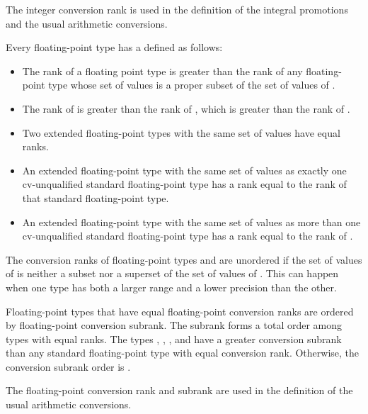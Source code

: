 \begin{note}
The integer conversion rank is used in the definition of the integral
promotions and the usual arithmetic
conversions.
\end{note}

\pnum
Every floating-point type has a 
defined as follows:
\begin{itemize}
\item
The rank of a floating point type  is greater than
the rank of any floating-point type
whose set of values is a proper subset of the set of values of .
\item
The rank of  is greater than
the rank of ,
which is greater than the rank of .
\item
Two extended floating-point types with the same set of values have equal ranks.
\item
An extended floating-point type with the same set of values as
exactly one cv-unqualified standard floating-point type
has a rank equal to the rank of that standard floating-point type.
\item
An extended floating-point type with the same set of values as
more than one cv-unqualified standard floating-point type
has a rank equal to the rank of .
\end{itemize}
\begin{note}
The conversion ranks of floating-point types  and 
are unordered if the set of values of  is
neither a subset nor a superset of the set of values of .
This can happen when one type has both a larger range and a lower precision
than the other.
\end{note}

\pnum
Floating-point types that have equal floating-point conversion ranks
are ordered by floating-point conversion subrank.
The subrank forms a total order among types with equal ranks.
The types
,
,
, and
have a greater conversion subrank than any standard floating-point type
with equal conversion rank.
Otherwise, the conversion subrank order is
.

\pnum
\begin{note}
The floating-point conversion rank and subrank are used in
the definition of the usual arithmetic conversions.
\end{note}

